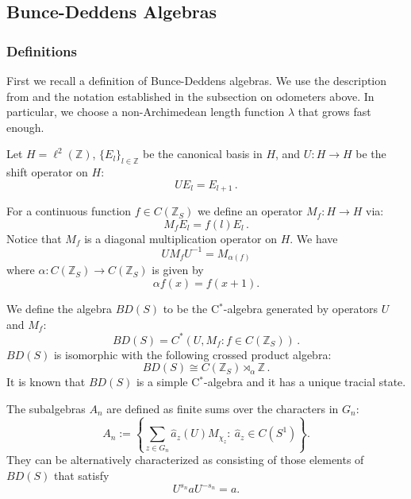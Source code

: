 \documentclass[12pt,reqno]{amsart}
\numberwithin{equation}{section}
\newcommand{\Z}{{\mathbb Z}}
\begin{document}
\subsection{Bunce-Deddens Algebras} 

\subsubsection{Definitions}

First we recall a definition of Bunce-Deddens algebras. We use the description from \cite{KMP2} and the notation established in the subsection on odometers above. In particular, we choose a non-Archimedean length function $\lambda$ that grows fast enough.

Let $H=\ell^2(\Z)$,  $\{E_l\}_{l\in\Z}$ be the canonical basis in $H$, and  $U:H\to H$ be the shift operator on $H$:
\begin{equation*}
UE_l = E_{l+1}\,.
\end{equation*} 

For a continuous function $f\in C(\Z_S)$ we define an operator $M_f:H\to H$ via:
\begin{equation*}
M_fE_l = f(l)E_l\,.
\end{equation*}
Notice that $M_f$ is a diagonal multiplication operator on $H$.  
We have
\begin{equation*}
UM_fU^{-1}=M_{\alpha(f)}
\end{equation*}
where $\alpha: C(\Z_S)\to C(\Z_S)$ is given by 
$$\alpha f(x)=f(x+1).$$

We define the algebra $BD(S)$ to be the C$^*$-algebra generated by operators $U$ and $M_f$:
\begin{equation*}
BD(S)=C^*(U,M_f: f\in C(\Z_S))\,.
\end{equation*} 
$BD(S)$ is isomorphic with the following crossed product algebra:
\begin{equation*}
BD(S)\cong C(\Z_S)\rtimes_\alpha \Z\,.
\end{equation*} 
It is known \cite{Dav} that $BD(S)$ is a simple C$^*$-algebra and it has a unique tracial state.

The subalgebras $A_n$  are defined as finite sums over the characters in $G_n$:
\begin{equation*}
A_n:=\left\{\sum_{z\in G_n} \hat{a}_z(U) M_{\chi_z}:\  \hat{a}_z\in C(S^1)\right\}.
\end{equation*}
They can be alternatively characterized as consisting of those elements of $BD(S)$ that satisfy
\begin{equation*}
U^{s_n}aU^{-s_n}=a.
\end{equation*}
\end{document}
